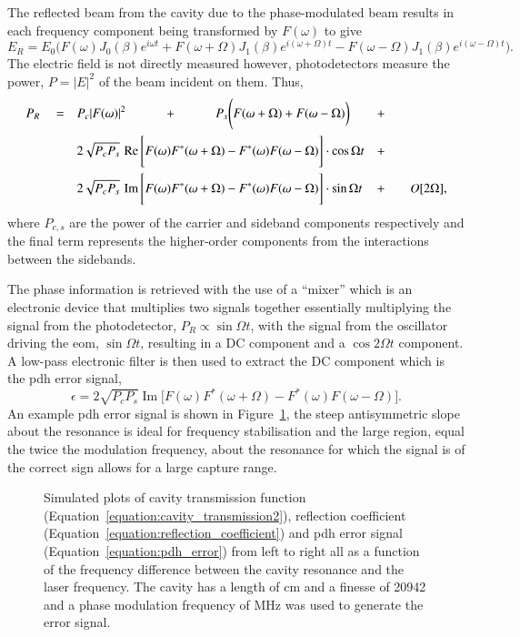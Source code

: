 {The reflected beam from the cavity due to the phase-modulated beam results in each frequency component being transformed by $F(\omega)$ to give
\begin{equation}
E_R = E_0 \Bigg(F(\omega)J_0(\beta)e^{i\omega t} + F(\omega+\Omega)J_1(\beta)e^{i(\omega+\Omega) t} - F(\omega-\Omega)J_1(\beta)e^{i(\omega-\Omega) t} \Bigg).
\end{equation}
The electric field is not directly measured however, photodetectors measure the power, $P=|E|^2$ of the beam incident on them.
Thus,
\begin{align}
P_R \quad= \quad&P_c|F(\omega)|^2 \quad\qquad+\quad\qquad P_s \Bigg( F(\omega+\Omega) + F(\omega-\Omega)\bigg) &+\qquad&\notag\\
& 2\sqrt{P_cP_s} \, \operatorname{Re}\Bigg[ F(\omega)F^*(\omega+\Omega)-F^*(\omega)F(\omega-\Omega)\Bigg]\cdot\cos\Omega t &+\qquad& \notag\\
& 2\sqrt{P_cP_s} \, \operatorname{Im}\Bigg[ F(\omega)F^*(\omega+\Omega)-F^*(\omega)F(\omega-\Omega)\Bigg]\cdot\sin\Omega t &+ \qquad&O[2\Omega],
\end{align}
where $P_{c,s}$ are the power of the carrier and sideband components respectively and the final term represents the higher-order components from the interactions between the sidebands.

The phase information is retrieved with the use of a ``mixer'' which is an electronic device that multiplies two signals together essentially multiplying the signal from the photodetector, $P_R \propto \sin\Omega t$, with the signal from the oscillator driving the \gls{eom}, $\sin\Omega t$, resulting in a DC component and a $\cos2\Omega t$ component.
A low-pass electronic filter is then used to extract the DC component which is the \gls{pdh} error signal,
\begin{equation}\label{equation:pdh_error}
\epsilon = 2\sqrt{P_cP_s}\operatorname{Im}\Bigg[F(\omega)F^*(\omega+\Omega) - F^*(\omega)F(\omega-\Omega)\Bigg].
\end{equation}
An example \gls{pdh} error signal is shown in Figure~\ref{figure:pdh_plots}, the steep antisymmetric slope about the resonance is ideal for frequency stabilisation and the large region, equal the twice the modulation frequency, about the resonance for which the signal is of the correct sign allows for a large capture range. 

\begin{figure}
\centering

\caption{Simulated plots of cavity transmission function (Equation~\ref{equation:cavity_transmission2}), reflection coefficient (Equation~\ref{equation:reflection_coefficient}) and \gls{pdh} error signal (Equation~\ref{equation:pdh_error}) from left to right all as a function of the frequency difference between the cavity resonance and the laser frequency.
The cavity has a length of \unit[10]{cm} and a finesse of 20942 and a phase modulation frequency of \unit[2]{MHz} was used to generate the error signal.}
\label{figure:pdh_plots}
\end{figure}

}
